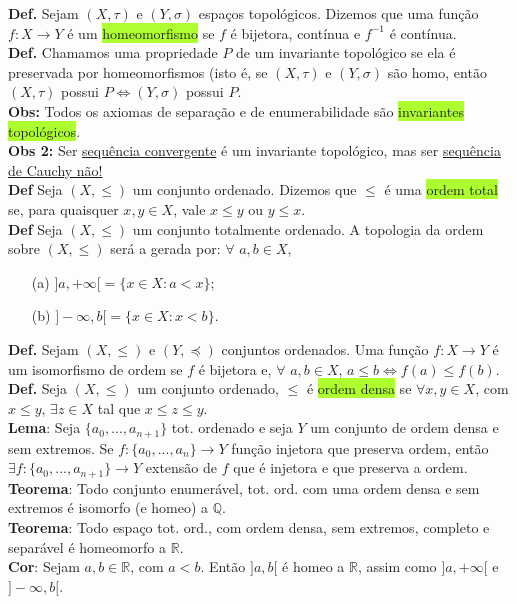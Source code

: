 \documentclass{article}
\begin{document}
\begin{landscape}
\begin{multicols}{3}
\textbf{Def.} Sejam \((X, \tau)\) e \((Y, \sigma)\) espaços topológicos. Dizemos que uma função \( f : X \rightarrow Y \) é um \colorbox{GreenYellow}{homeomorfismo} se $f$ é bijetora, contínua e $f^{-1}$ é contínua.\\
\textbf{Def.} Chamamos uma propriedade \( P \) de um invariante topológico se ela é preservada por homeomorfismos (isto é, se $(X, \tau)$ e $(Y, \sigma)$ são homo, então $(X, \tau)$ possui $P \iff (Y, \sigma)$ possui $P$.\\
\textbf{Obs:} Todos os axiomas de separação e de enumerabilidade são \colorbox{GreenYellow}{invariantes topológicos}.\\
\textbf{Obs 2:} Ser \underline{sequência convergente} é um invariante topológico, mas ser \underline{sequência de Cauchy não!}\\
\textbf{Def} Seja \((X, \leq)\) um conjunto ordenado. Dizemos que \(\leq\) é uma \colorbox{GreenYellow}{ordem total} se, para quaisquer \( x, y \in X \), vale \( x \leq y \) ou \( y \leq x \).\\
\textbf{Def} Seja \((X, \leq)\) um conjunto totalmente ordenado. A topologia da ordem sobre \((X, \leq)\) será a gerada por: $\forall$ \( a, b \in X \),
\begin{enumerate}
    \item[(a)] \( ]a, +\infty[ = \{ x \in X : a < x \} \);
    \item[(b)] \( ]-\infty, b[ = \{ x \in X : x < b \} \).
\end{enumerate}
\textbf{Def.} Sejam \((X, \leq)\) e \((Y, \preceq)\) conjuntos ordenados. Uma função \( f : X \rightarrow Y \) é um isomorfismo de ordem se $f$ é bijetora e, $\forall$ \( a, b \in X \), \( a \leq b \Leftrightarrow f(a) \leq f(b) \).\\
\textbf{Def.} Seja \((X, \leq)\) um conjunto ordenado, $\leq$ é \colorbox{GreenYellow}{ordem densa} se $\forall x,y \in X$, com \( x \leq y \), $\exists$\( z \in X \) tal que \( x \leq z \leq y \).\\
\textbf{Lema}: Seja $\{a_0,...,a_{n+1}\}$ tot. ordenado e seja $Y$ um conjunto de ordem densa e sem extremos. Se $f:\{a_0,...,a_n\} \rightarrow Y$ função injetora que preserva ordem, então $\exists f:\{a_0,...,a_{n+1}\} \rightarrow Y$ extensão de $f$ que é injetora e que preserva a ordem.\\
\textbf{Teorema}: Todo conjunto enumerável, tot. ord. com uma ordem densa e sem extremos é isomorfo (e homeo) a $\mathbb{Q}$.\\
\textbf{Teorema}: Todo espaço tot. ord., com ordem densa, sem extremos, completo e separável é homeomorfo a $\mathbb{R}$.\\
\textbf{Cor}: Sejam $a,b \in \mathbb{R}$, com $a < b$. Então $]a,b[$ é homeo a $\mathbb{R}$, assim como $]a,+\infty[$ e $]-\infty, b[$.
\end{multicols}
\begin{center}
    

\end{center}
\end{landscape}
\end{document}
